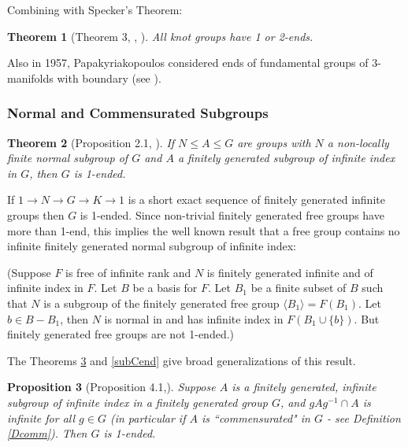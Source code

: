\documentclass[12pt]{article}
\newtheorem{theorem}{Theorem}[subsection]
\newtheorem{proposition}[theorem]{Proposition}
\begin{document}
Combining with Specker's Theorem: 
\begin{theorem} [Theorem 3, \cite{Pap57}, \cite{Pap57b}] 
All knot groups have 1 or 2-ends.
\end{theorem} 

Also in 1957, Papakyriakopoulos considered ends of fundamental groups of $3$-manifolds with boundary (see \cite{Pap57c}).

\subsubsection{Normal and Commensurated Subgroups}\label{normalE}

\begin{theorem} [Proposition 2.1, \cite{Co72}] \label{cohen} 
If $N\leq A\leq G$ are groups with $N$ a non-locally finite normal subgroup of $G$ and $A$ a finitely generated subgroup of infinite index in $G$, then $G$ is 1-ended.
\end{theorem}

If $1\to N\to G\to K\to 1$ is a short exact sequence of finitely generated infinite groups then $G$ is 1-ended. Since non-trivial finitely generated free groups have more than 1-end, this implies the well known result that a free group contains no infinite finitely generated normal subgroup of infinite index: 

(Suppose $F$ is free of infinite rank and $N$ is finitely generated infinite and of infinite index in $F$. Let $B$ be a basis for $F$. Let $B_1$ be a finite subset of $B$ such that $N$ is a subgroup of the finitely generated free group $\langle B_1\rangle=F(B_1)$.  Let $b\in B-B_1$, then $N$ is normal in and has infinite index in $F(B_1\cup \{b\})$. But finitely generated free groups are not 1-ended.)

The Theorems \ref{superC} and \ref{subCend} give broad generalizations of this result.


\begin{proposition} [Proposition 4.1,\cite{CM2}] \label{superC}  Suppose $A$ is a finitely generated, infinite subgroup of infinite index in a finitely generated group $G$, and $gAg^{-1}\cap A$ is infinite for all $g\in G$ (in particular if $A$ is ``commensurated" in $G$ - see Definition \ref{Dcomm}). Then $G$ is 1-ended.
\end{proposition}
\end{document}
